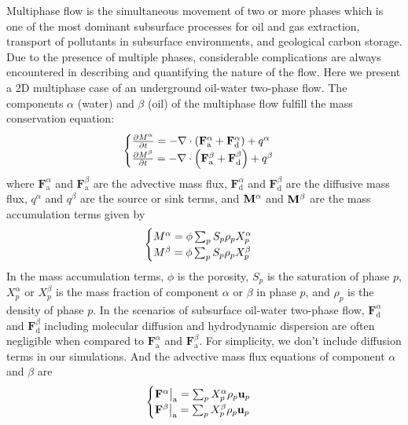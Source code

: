 Multiphase flow is the simultaneous movement of two or more phases which is one of the most dominant subsurface processes for oil and gas extraction, transport of pollutants in subsurface environments, and geological carbon storage. Due to the presence of multiple phases, considerable complications are always encountered in describing and quantifying the nature of the flow. Here we present a 2D multiphase case of an underground oil-water two-phase flow. 
The components $\alpha$ (water) and $\beta$ (oil) of the multiphase flow fulfill the mass conservation equation:
\begin{equation}
	\begin{cases}
		\frac{\partial M^\alpha}{\partial t} = -\nabla \cdot \left( \mathbf{F}^\alpha_{\text{a}} + \mathbf{F}^\alpha_{\text{d}} \right) + q^\alpha \notag \\
		
		\frac{\partial M^\beta}{\partial t} = -\nabla \cdot \left( \mathbf{F}^\beta_{\text{a}} + \mathbf{F}^\beta_{\text{d}} \right) + q^\beta \notag
	\end{cases}
\end{equation}
where $\mathbf{F}^\alpha_{\text{a}}$ and $\mathbf{F}^\beta_{\text{a}}$ are the advective mass flux, $\mathbf{F}^\alpha_{\text{d}}$ and $\mathbf{F}^\beta_{\text{d}}$ are the diffusive mass flux, $q^\alpha$ and $q^\beta$ are the source or sink terms, and ${\bf M}^\alpha$ and ${\bf M}^\beta$ are the mass accumulation terms given by
\begin{equation}
	\begin{cases}
		M^{\alpha} = \phi \sum_{p} S_{p} \rho_{p} X_{p}^{\alpha} \notag \\
		M^{\beta} = \phi \sum_{p} S_{p} \rho_{p} X_{p}^{\beta} \notag
	\end{cases}
\end{equation}
In the mass accumulation terms, $\phi$ is the porosity, $S_{p}$ is the saturation of phase $p$, $X_{p}^{\alpha}$ or $X_{p}^{\beta}$ is the mass
fraction of component $\alpha$ or $\beta$ in phase $p$, and $\rho_{p}$ is the density of phase $p$.
In the scenarios of subsurface oil-water two-phase flow, $\mathbf{F}^\alpha_{\text{d}}$ and $\mathbf{F}^\beta_{\text{d}}$ including molecular diffusion and hydrodynamic dispersion are often negligible when compared to $\mathbf{F}^\alpha_{\text{a}}$ and $\mathbf{F}^\beta_{\text{a}}$. For simplicity, we don't include diffusion terms in our simulations. And the advective mass flux equations of component $\alpha$ and $\beta$ are
\begin{equation}
	\begin{cases}
		\mathbf{F}^\alpha \big|_{\text{a}} = \sum_p X_p^\alpha \rho_p \mathbf{u}_p \notag \\
		\mathbf{F}^\beta \big|_{\text{a}} = \sum_p X_p^\beta \rho_p \mathbf{u}_p \notag
	\end{cases}
\end{equation}
